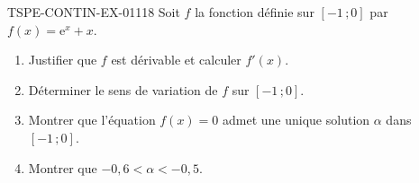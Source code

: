 \begin{exercice}{TSPE-CONTIN-EX-011}{1}{8}
Soit $f$ la fonction définie sur $[-1\,;0]$ par $f(x) = \mathrm{e}^{x} + x$.
\begin{enumerate}
  \item Justifier que $f$ est dérivable et calculer $f'(x)$.
  \item Déterminer le sens de variation de $f$ sur $[-1\,;0]$.
  \item Montrer que l'équation $f(x) = 0$ admet une unique solution $\alpha$ dans $[-1\,;0]$.
  \item Montrer que $-0{,}6 < \alpha < -0{,}5$.
\end{enumerate}
\end{exercice}
